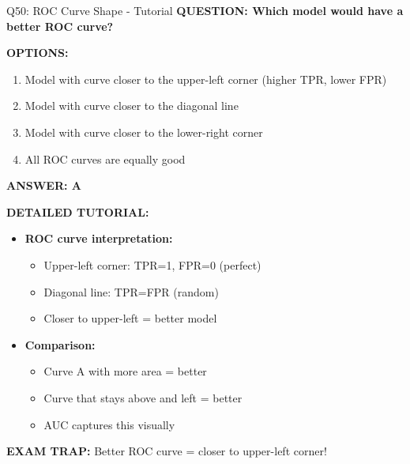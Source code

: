 \documentclass[8pt]{beamer}
\begin{document}
	\begin{frame}{Q50: ROC Curve Shape - Tutorial}
		\fontsize{6.5}{7.5}\selectfont
		\textbf{QUESTION: Which model would have a better ROC curve?}
		
		\vspace{0.1cm}
		\textbf{OPTIONS:}
		\begin{enumerate}
			\item Model with curve closer to the upper-left corner (higher TPR, lower FPR)
			\item Model with curve closer to the diagonal line
			\item Model with curve closer to the lower-right corner
			\item All ROC curves are equally good
		\end{enumerate}
		
		\vspace{0.1cm}
		\textcolor{myblue}{\textbf{ANSWER: A}}
		
		\vspace{0.1cm}
		\textbf{DETAILED TUTORIAL:}
		\begin{itemize}
			\item \textbf{ROC curve interpretation:}
			\begin{itemize}
				\item Upper-left corner: TPR=1, FPR=0 (perfect)
				\item Diagonal line: TPR=FPR (random)
				\item Closer to upper-left = better model
			\end{itemize}
			\item \textbf{Comparison:}
			\begin{itemize}
				\item Curve A with more area = better
				\item Curve that stays above and left = better
				\item AUC captures this visually
			\end{itemize}
		\end{itemize}
		
		\textcolor{myred}{\textbf{EXAM TRAP:}} Better ROC curve = \textcolor{myblue}{closer to upper-left corner}!
	\end{frame}
	
\end{document}
